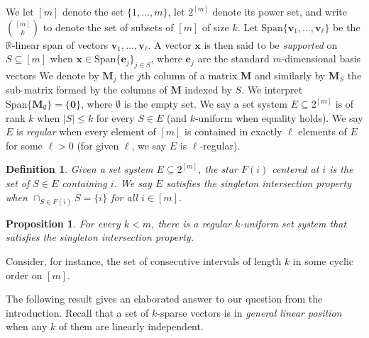\documentclass[9pt,twocolumn]{pnas-new}
\newtheorem{proposition}{Proposition}
\newtheorem{definition}{Definition}
\begin{document}
We let $[m]$ denote the set $\{1, \ldots, m\}$, let $2^{[m]}$ denote its power set, and write ${[m] \choose k}$ to denote the set of subsets of $[m]$ of size $k$. Let $\text{Span}\{\mathbf{v}_1, \ldots, \mathbf{v}_\ell\}$ be the $\mathbb{R}$-linear span of vectors $\mathbf{v}_1, \ldots, \mathbf{v}_\ell$. A vector $\mathbf{x}$ is then said to be \emph{supported} on $S \subseteq [m]$ when $\mathbf{x} \in \text{Span} \{\mathbf{e}_j\}_{j\in S}$, where $\mathbf{e}_j$ are the standard $m$-dimensional basis vectors We denote by $\mathbf{M}_j$ the $j$th column of a matrix $\mathbf{M}$ and similarly by $\mathbf{M}_S$ the sub-matrix formed by the columns of $\mathbf{M}$ indexed by $S$. We interpret $\text{Span}\{\mathbf{M}_\emptyset\} = \{\textbf{0}\}$, where $\emptyset$ is the empty set. We say a set system $E \subseteq 2^{[m]}$ is of rank $k$ when $|S| \leq k$ for every $S \in E$ (and $k$-uniform when equality holds). We say $E$ is \emph{regular} when every element of $[m]$ is contained in exactly $\ell$ elements of $E$ for some $\ell > 0$ (for given $\ell$, we say $E$ is $\ell$-regular).

\begin{definition}
Given a set system $E \subseteq 2^{[m]}$, the \emph{star} $F(i)$ centered at $i$ is the set of $S \in E$ containing $i$. We say $E$ satisfies the \emph{singleton intersection property} when $\cap_{S \in F(i)} S = \{i\}$ for all $i \in [m]$. 
\end{definition}

\begin{proposition}
For every $k < m$, there is a regular $k$-uniform set system that satisfies the singleton intersection property.
\end{proposition}
Consider, for instance, the set of consecutive intervals of length $k$ in some cyclic order on $[m]$.

The following result gives an elaborated answer to our question from the introduction. Recall that a set of $k$-sparse vectors is in \emph{general linear position} when any $k$ of them are linearly independent.
\end{document}
